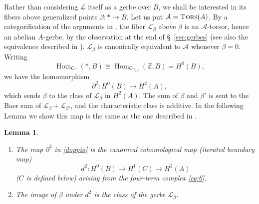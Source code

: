 \documentclass{amsart}
\numberwithin{equation}{subsection}
\newtheorem{lemma}[theorem]{Lemma}
\theoremstyle{remark}
\theoremstyle{remark}
\newcommand{\too}{\longrightarrow}%
\newcommand{\cA}{\mathcal{A}}
\newcommand{\cL}{\mathcal{L}}
\newcommand{\bbZ}{\mathbb{Z}}
\newcommand{\C}{\mathsf{C}} %
\DeclareMathOperator{\Hom}{Hom}
\newcommand{\iso}{\cong}
\newcommand{\shC}{\C\sptilde} %
\newcommand{\shAbC}{\shC_\mathrm{ab}} %
\DeclareMathOperator{\tors}{\textsc{Tors}} %
\begin{document}
Rather than considering $\cL$ itself as a gerbe over $B$, we shall be interested in its fibers above generalized points $\beta\colon *\to B$. Let us put $\cA=\tors(A)$.
By a categorification of the arguments in \cite{GrothendieckSGA7},
the fiber $\cL_\beta$ above $\beta$ is an $\cA$-torsor, hence an  abelian $A$-gerbe, by the observation at the end of \S~\ref{sec:gerbes} (see also the equivalence described in \cite{Breen90}). $\cL_\beta$ is canonically equivalent to $\cA$ whenever $\beta=0$. Writing
\begin{equation*}
  \Hom_{\shC}(*,B) \iso \Hom_{\shAbC}(\bbZ,B) = H^0(B),
\end{equation*}
we have the homomorphism
\begin{equation}\label{doppio}
 \partial^2:  H^0(B) \too H^2(A),
\end{equation}
which sends $\beta$ to the class of $\cL_\beta$ in $H^2(A)$. The sum of $\beta$ and $\beta'$ is sent to the Baer sum of $\cL_\beta+\cL_{\beta'}$, and the characteristic class is additive.  In the following Lemma we show this map is the same as the one described in \cite[Théorème 3.4.2]{Giraud}.
\begin{lemma}
  \label{comparisons}
  \hfill
  \begin{enumerate}
  \item The map $\partial^2$ in \eqref{doppio} is the canonical cohomological map (iterated boundary map) \cite[Théorème 3.4.2]{Giraud}
    \begin{equation*}
      d^2: H^0(B) \too H^1(C) \too H^2(A)
    \end{equation*}
    ($C$ is defined below) arising from the four-term complex \eqref{eq:6}.
  \item The image of $\beta$ under $d^2$ is the class of  the gerbe $\cL_{\beta}$. 
  \end{enumerate}
\end{lemma}
\end{document}
